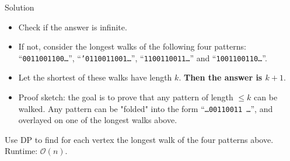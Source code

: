 \begin{frame}
	\frametitle{\problemtitle}
	\begin{block}{Solution}
		\begin{itemize}
			\item Check if the answer is infinite.
			\item If not, consider the longest walks of the following four patterns:\\
			``\texttt{0011001100\dots}'', ``\texttt{'0110011001\dots}'', ``\texttt{1100110011\dots}'' and ``\texttt{1001100110\dots}''.
			\pause
			\item Let the shortest of these walks have length $k$. \textbf{Then the answer is $k+1$}.
			\item Proof sketch: the goal is to prove that any pattern of length $\leq k$ can be walked.
			Any pattern can be "folded" into the form ``\texttt{\dots 00110011 \dots}'', and overlayed on one of the longest walks above.
		\end{itemize}
		Use DP to find for each vertex the longest walk of the four patterns above.
		Runtime: $\mathcal{O}(n)$.
	\end{block}
    \solvestats
\end{frame}
